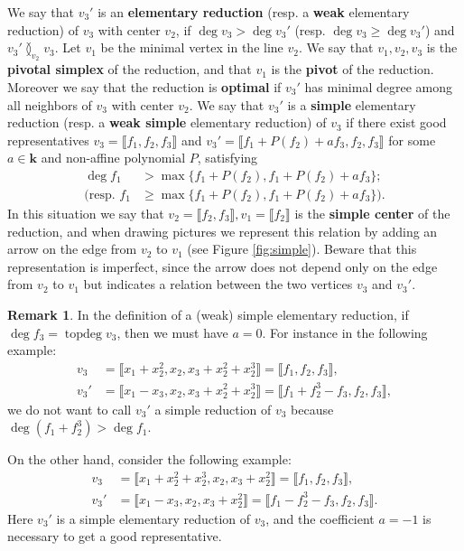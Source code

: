 \documentclass[reqno,oneside,11pt]{amsart}
\theoremstyle{plain}
\theoremstyle{definition}
\newtheorem{remark}[theorem]{Remark}
\newcommand{\K}{\mathbf{k}}
\DeclareMathOperator{\topdeg}{topdeg}
\renewcommand{\ne}{\between}
\newcommand{\llb}{\llbracket}
\newcommand{\rrb}{\rrbracket}
\renewcommand{\ge}{\geqslant}
\begin{document}
We say that $v_3'$ is an \textbf{elementary reduction} (resp. a \textbf{weak} elementary reduction)  of $v_3$ with center $v_2$, if $\deg v_3 > \deg v_3' $ (resp. $\deg v_3 \ge \deg v_3'$) and $v_3' \ne_{v_2} v_3$.
Let $v_1$ be the minimal vertex in the line $v_2$.
We say that $v_1, v_2, v_3$ is the \textbf{pivotal simplex} of the reduction,
and that $v_1$ is the \textbf{pivot} of the reduction. \label{def:pivot}
Moreover we say that the reduction is \textbf{optimal} if $v_3'$ has minimal degree among all neighbors of $v_3$ with center $v_2$.
We say that $v_3'$ is a \textbf{simple} elementary reduction (resp. a \textbf{weak simple} elementary reduction) of
$v_3$ if there exist good representatives $v_3 = \llb f_1, f_2, f_3 \rrb$ and
$v_3' = \llb f_1 + P(f_2) + af_3, f_2, f_3 \rrb$ for some $a \in \K$
and non-affine polynomial $P$, satisfying
\begin{align*}
\deg f_1 &> \max\{f_1 + P(f_2), f_1 + P(f_2) + af_3\}; \\
\text{(resp. } f_1 &\ge \max\{f_1 + P(f_2), f_1 + P(f_2) + af_3\}\text{)}.
\end{align*}
In this situation we say that $v_2 = \llb f_2, f_3 \rrb, v_1 = \llb f_2 \rrb$ is the \textbf{simple center} of the reduction, and when drawing pictures we represent this relation by adding an arrow on the edge from $v_2$ to $v_1$ (see Figure \ref{fig:simple}).
Beware that this representation is imperfect, since the arrow does not depend only on the edge from $v_2$ to $v_1$ but indicates a relation between the two vertices $v_3$ and $v_3'$.

\begin{remark} \label{rem:simple}
In the definition of a (weak) simple elementary reduction, if $\deg f_3 = \topdeg v_3$, then we must have $a = 0$.
For instance in the following example:
\begin{align*}
v_3 &= \llb x_1 + x_2^2, x_2, x_3 + x_2^2 + x_2^3 \rrb = \llb f_1, f_2, f_3 \rrb,\\
v_3' &= \llb x_1 - x_3, x_2, x_3 + x_2^2 + x_2^3 \rrb = \llb f_1 + f_2^3 - f_3, f_2, f_3 \rrb,
\end{align*}
we do not want to call $v_3'$ a simple reduction of $v_3$ because $\deg (f_1 +
f_2^3) > \deg f_1$.

On the other hand, consider the following example:
\begin{align*}
v_3 &= \llb x_1 +x_2^2 + x_2^3, x_2, x_3 + x_2^2 \rrb = \llb f_1, f_2, f_3 \rrb ,\\
v_3' &= \llb x_1 - x_3, x_2, x_3 + x_2^2 \rrb = \llb f_1 - f_2^3 - f_3, f_2, f_3 \rrb.
\end{align*}
Here $v_3'$ is a simple elementary reduction of $v_3$, and the coefficient $a = -1$ is necessary to get a good representative.
\end{remark}
\end{document}
